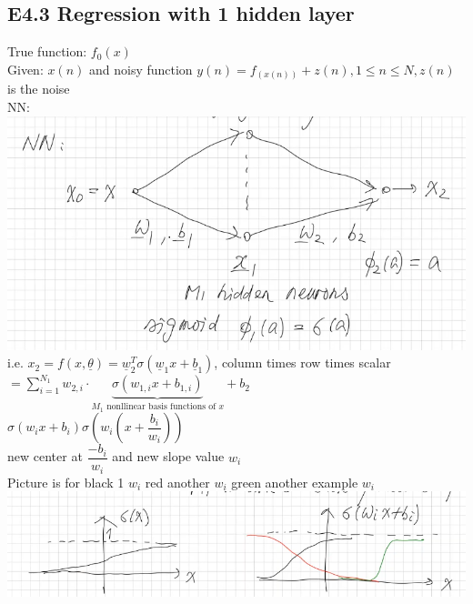 \subsection{E4.3 Regression with 1 hidden layer}
True function: $ f_0(x)   $\\
Given: $ x(n)  $ and noisy function $ y(n) = f_(x(n)) + z(n) , 1 \leq n \leq N  ,z(n)$ is the noise \\
NN: \\
\includegraphics[width=\linewidth]{Images/E43Architecture.png}\\
i.e. $  x_2 = f(x, \underline{\theta}) = \underline{w}_2^T \sigma ( \underline{w}_1 x + \underline{b}_1 )  $, column times row times scalar \\
$ = \sum_{i=1}^{N_1} w_{2,i} \cdot \underbrace{\sigma ( w_{1,i} x + b_{1,i}) }_{M_1 \text{ nonllinear basis functions of }x} + b_2$ \\
$ \sigma ( w_i x + b_i ) \sigma (w_i ( x + \dfrac{b_i}{w_i})) $ \\
new center at $ \dfrac{-b_i}{w_i} $ and new slope value $ w_i $ \\
Picture is for black 1 $ w_i $ red another $ w_i $ green another example $ w_i $\\
\includegraphics[width=\linewidth]{Images/E43Sketchsigmoid.png}

